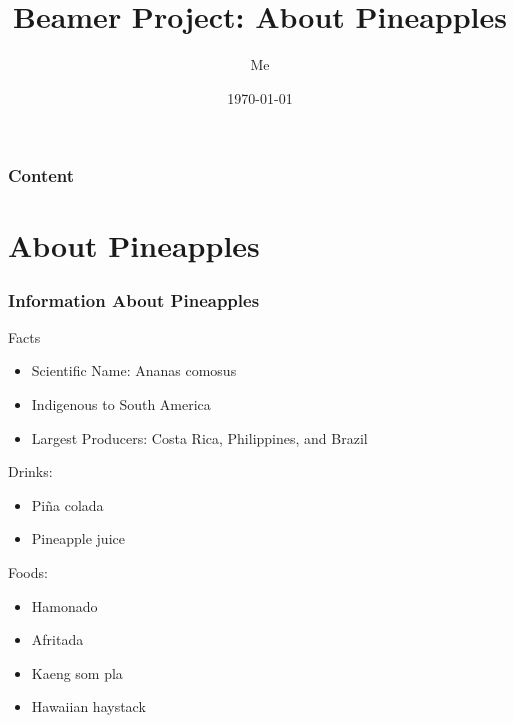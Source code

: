 \documentclass{beamer}
\title{Beamer Project: About Pineapples}
\author{Me}
\date{\today}
\institute{Some Institute}
\begin{document}
\maketitle

\begin{frame}
    \frametitle{Content}
    \tableofcontents
\end{frame}

\section{About Pineapples}

\begin{frame}
    \frametitle{Information About Pineapples}

    \begin{block}{Facts}
        \begin{itemize}
            \item Scientific Name: Ananas comosus \pause
            \item Indigenous to South America \pause
            \item Largest Producers: Costa Rica, Philippines, and Brazil \pause
        \end{itemize}
    \end{block}

    \begin{example}
        Drinks: \pause

        \begin{itemize}
            \item Piña colada \pause
            \item Pineapple juice \pause
        \end{itemize}

        Foods: \pause

        \begin{itemize}
            \item Hamonado \pause
            \item Afritada \pause
            \item Kaeng som pla \pause
            \item Hawaiian haystack
        \end{itemize}

    \end{example}

\end{frame}
\end{document}
